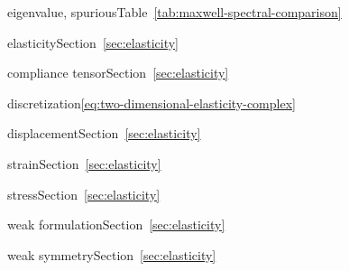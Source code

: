 \par\noindent\hspace*{0em}\label{index:eigenvalue-spurious}{eigenvalue, spurious}\quad Table~\ref{tab:maxwell-spectral-comparison}

\par\noindent\hspace*{0em}\label{index:elasticity}{elasticity}\quad Section~\ref{sec:elasticity}

\par\noindent\hspace*{1em}\label{index:elasticity-compliance-tensor}{compliance tensor}\quad Section~\ref{sec:elasticity}

\par\noindent\hspace*{1em}\label{index:elasticity-discretization}{discretization}\quad \eqref{eq:two-dimensional-elasticity-complex}

\par\noindent\hspace*{1em}\label{index:elasticity-displacement}{displacement}\quad Section~\ref{sec:elasticity}

\par\noindent\hspace*{1em}\label{index:elasticity-strain}{strain}\quad Section~\ref{sec:elasticity}

\par\noindent\hspace*{1em}\label{index:elasticity-stress}{stress}\quad Section~\ref{sec:elasticity}

\par\noindent\hspace*{1em}\label{index:elasticity-weak-formulation}{weak formulation}\quad Section~\ref{sec:elasticity}

\par\noindent\hspace*{1em}\label{index:elasticity-weak-symmetry}{weak symmetry}\quad Section~\ref{sec:elasticity}

